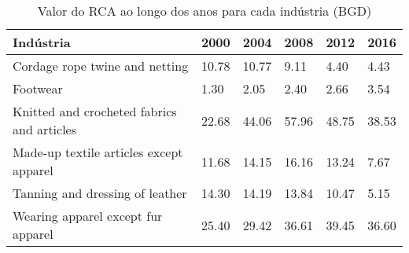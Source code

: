 \begin{table}
\centering
\caption{Valor do RCA ao longo dos anos para cada indústria (BGD)}
\label{tab:ex3-tempo-BGD}
\begin{tabular}{p{6cm}p{1.5cm}p{1.5cm}p{1.5cm}p{1.5cm}p{1.5cm}}
\toprule
                                 Indústria &  2000 &  2004 &  2008 &  2012 &  2016 \\
\midrule
            Cordage rope twine and netting & 10.78 & 10.77 &  9.11 &  4.40 &  4.43 \\
                                  Footwear &  1.30 &  2.05 &  2.40 &  2.66 &  3.54 \\
Knitted and crocheted fabrics and articles & 22.68 & 44.06 & 57.96 & 48.75 & 38.53 \\
   Made-up textile articles except apparel & 11.68 & 14.15 & 16.16 & 13.24 &  7.67 \\
           Tanning and dressing of leather & 14.30 & 14.19 & 13.84 & 10.47 &  5.15 \\
        Wearing apparel except fur apparel & 25.40 & 29.42 & 36.61 & 39.45 & 36.60 \\
\bottomrule
\end{tabular}
\end{table}
